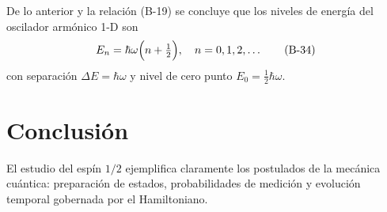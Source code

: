 \documentclass[a4paper,11pt]{article}
\begin{document}
De lo anterior y la relación (B-19) se concluye que los niveles de energía del oscilador armónico 1-D son
\[
E_n=\hbar\omega\Bigl(n+\tfrac12\Bigr),
\quad n=0,1,2,\dots
\tag{B-34}
\]
con separación \(\Delta E=\hbar\omega\) y nivel de cero punto \(E_0=\tfrac12\hbar\omega\).


\section*{Conclusión}
El estudio del espín $1/2$ ejemplifica claramente los postulados de la mecánica cuántica: preparación de estados, probabilidades de medición y evolución temporal gobernada por el Hamiltoniano.
\end{document}

